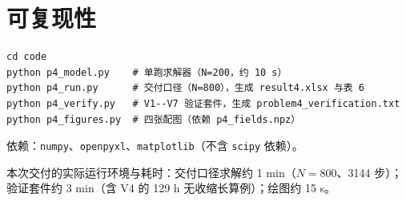\documentclass[11pt]{ctexart}
\begin{document}
\section{可复现性}

\begin{verbatim}
cd code
python p4_model.py    # 单跑求解器（N=200，约 10 s）
python p4_run.py      # 交付口径（N=800），生成 result4.xlsx 与表 6
python p4_verify.py   # V1--V7 验证套件，生成 problem4_verification.txt
python p4_figures.py  # 四张配图（依赖 p4_fields.npz）
\end{verbatim}

依赖：\texttt{numpy}、\texttt{openpyxl}、\texttt{matplotlib}（不含 \texttt{scipy} 依赖）。

本次交付的实际运行环境与耗时：交付口径求解约 1 min（$N = 800$、3144 步）；验证套件约 3 min（含 V4 的 129 h 无收缩长算例）；绘图约 15 s。
\end{document}
